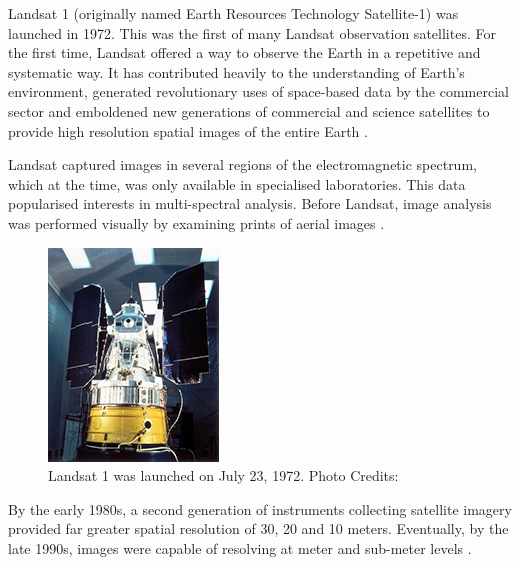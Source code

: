 Landsat 1 (originally named Earth Resources Technology Satellite-1) was launched in 1972. This was the first of many Landsat observation satellites. For the first time, Landsat
offered a way to observe the Earth in a repetitive and systematic way. It has contributed heavily to the understanding of Earth's environment, generated revolutionary uses of space-based data by the commercial sector and emboldened new generations of commercial and science satellites to provide high resolution spatial images of the entire Earth \cite{campbell2011introduction, Williams:2006:0099-1112:1171}.

\par

Landsat captured images in several regions of the electromagnetic spectrum, which at the time, was only available in specialised laboratories. This data popularised interests in multi-spectral analysis. Before Landsat, image analysis was performed visually by examining prints of aerial images \cite{campbell2011introduction}.

\begin{figure}[H]
\centering

\includegraphics[totalheight=0.2\textheight]{Landsat1.jpg}
\caption{Landsat 1 was launched on July 23, 1972. Photo Credits: \cite{landsat1}
}
\end{figure}

By the early 1980s, a second generation of instruments collecting satellite imagery provided far greater spatial resolution of 30, 20 and 10 meters. Eventually, by the late 1990s, images were capable of resolving at meter and  sub-meter levels \cite{campbell2011introduction}.

\par


